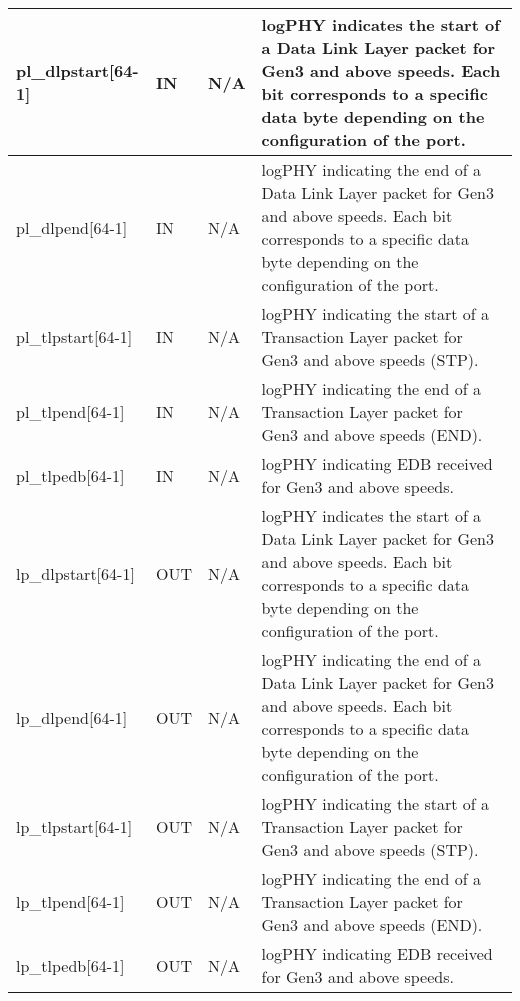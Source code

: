 \begin{table}[H]

    \centering
  \begin{tabular}{ |m{26mm}|P{10mm}|P{18mm}|m{60mm}|  }
  \hline

pl\_dlpstart[64-1] & IN &N/A & logPHY indicates the start of a Data Link Layer packet for Gen3 and above speeds. Each
bit corresponds to a specific data byte depending on the configuration of the port.\\ \hline 
pl\_dlpend[64-1]& IN &N/A & logPHY indicating the end of a Data Link Layer packet for Gen3 and above speeds. Each
bit corresponds to a specific data byte depending on the configuration of the port.\\ \hline
pl\_tlpstart[64-1]& IN &N/A &logPHY indicating the start of a Transaction Layer packet for Gen3 and above speeds
(STP). \\ \hline
pl\_tlpend[64-1]& IN &N/A & logPHY indicating the end of a Transaction Layer packet for Gen3 and above speeds
(END).\\ \hline
pl\_tlpedb[64-1]& IN &N/A & logPHY indicating EDB received for Gen3 and above speeds. \\ \hline

lp\_dlpstart[64-1] & OUT &N/A & logPHY indicates the start of a Data Link Layer packet for Gen3 and above speeds. Each
bit corresponds to a specific data byte depending on the configuration of the port.\\ \hline 
lp\_dlpend[64-1]& OUT &N/A & logPHY indicating the end of a Data Link Layer packet for Gen3 and above speeds. Each
bit corresponds to a specific data byte depending on the configuration of the port.\\ \hline
lp\_tlpstart[64-1]& OUT &N/A &logPHY indicating the start of a Transaction Layer packet for Gen3 and above speeds
(STP). \\ \hline
lp\_tlpend[64-1]& OUT &N/A & logPHY indicating the end of a Transaction Layer packet for Gen3 and above speeds
(END).\\ \hline
lp\_tlpedb[64-1]& OUT &N/A & logPHY indicating EDB received for Gen3 and above speeds. \\ \hline

\end{tabular}
\end{table}

